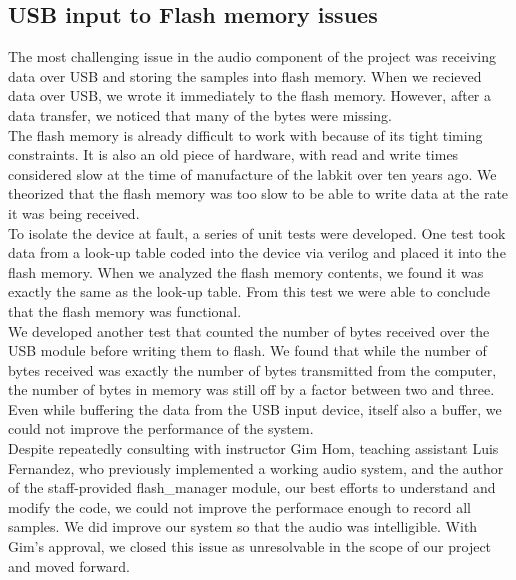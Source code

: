 \documentclass{article}
\begin{document}
\subsection{USB input to Flash memory issues}
The most challenging issue in the audio component of the project was receiving data over USB and storing the samples into flash memory. When we recieved data over USB, we wrote it immediately to the flash memory. However, after a data transfer, we noticed that many of the bytes were missing. \\
The flash memory is already difficult to work with because of its tight timing constraints. It is also an old piece of hardware, with read and write times considered slow at the time of manufacture of the labkit over ten years ago. We theorized that the flash memory was too slow to be able to write data at the rate it was being received. \\
To isolate the device at fault, a series of unit tests were developed. One test took data from a look-up table coded into the device via verilog and placed it into the flash memory. When we analyzed the flash memory contents, we found it was exactly the same as the look-up table. From this test we were able to conclude that the flash memory was functional. \\
We developed another test that counted the number of bytes received over the USB module before writing them to flash. We found that while the number of bytes received was exactly the number of bytes transmitted from the computer, the number of bytes in memory was still off by a factor between two and three. Even while buffering the data from the USB input device, itself also a buffer, we could not improve the performance of the system. \\
Despite repeatedly consulting with instructor Gim Hom, teaching assistant Luis Fernandez, who previously implemented a working audio system, and the author of the staff-provided flash\_manager module, our best efforts to understand and modify the code, we could not improve the performace enough to record all samples. We did improve our system so that the audio was intelligible. With Gim's approval, we closed this issue as unresolvable in the scope of our project and moved forward. 
\end{document}
